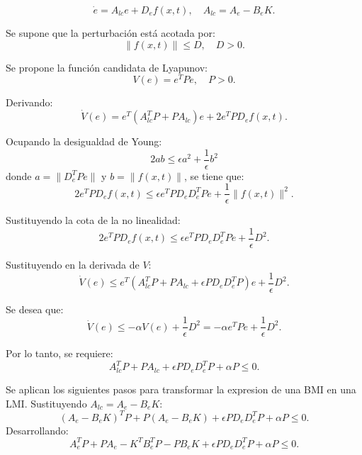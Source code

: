 \begin{itemize}
\begin{equation*}
    \dot{e} = A_{lc} e + D_e f(x,t), \quad A_{lc} = A_e - B_e K.
\end{equation*}

Se supone que la perturbación está acotada por:
\begin{equation*}
    \|f(x,t)\| \leq D, \quad D > 0.
\end{equation*}

Se propone la función candidata de Lyapunov:
\begin{equation*}
    V(e) = e^T P e, \quad P > 0.
\end{equation*}

Derivando:
\begin{equation*}
    \dot{V}(e) = e^T(A_{lc}^T P + P A_{lc})e + 2e^T P D_e f(x,t).
\end{equation*}

Ocupando la desigualdad de Young:
\begin{equation*}
    2ab \leq \epsilon a^2 + \frac{1}{\epsilon}b^2
\end{equation*}
donde \(a = \|D_e^T P e\|\) y \(b = \|f(x,t)\|\), se tiene que:
\begin{equation*}
    2e^T P D_e f(x,t) \leq \epsilon e^T P D_e D_e^T P e + \frac{1}{\epsilon}\|f(x,t)\|^2.
\end{equation*}

Sustituyendo la cota de la no linealidad:
\begin{equation*}
    2e^T P D_e f(x,t) \leq \epsilon e^T P D_e D_e^T P e + \frac{1}{\epsilon}D^2.
\end{equation*}

Sustituyendo en la derivada de \(V\):
\begin{equation*}
    \dot{V}(e) \leq e^T\left( A_{lc}^T P + P A_{lc} + \epsilon P D_e D_e^T P \right)e + \frac{1}{\epsilon}D^2.
\end{equation*}

Se desea que:
\begin{equation*}
    \dot{V}(e) \leq -\alpha V(e) + \frac{1}{\epsilon}D^2 = -\alpha e^T P e + \frac{1}{\epsilon}D^2.
\end{equation*}

Por lo tanto, se requiere:
\begin{equation*}
    A_{lc}^T P + P A_{lc} + \epsilon P D_e D_e^T P + \alpha P \leq 0.
\end{equation*}

Se aplican los siguientes pasos para transformar la expresion de una BMI en una LMI. Sustituyendo \(A_{lc} = A_e - B_e K\):
\begin{equation*}
    (A_e - B_e K)^T P + P(A_e - B_e K) + \epsilon P D_e D_e^T P + \alpha P \leq 0.
\end{equation*}
Desarrollando:
\begin{equation*}
    A_e^T P + P A_e - K^T B_e^T P - P B_e K + \epsilon P D_e D_e^T P + \alpha P \leq 0.
\end{equation*}


\end{itemize}
